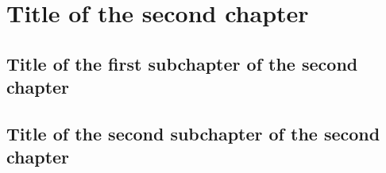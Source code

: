\chapter{Title of the second chapter}

\section{Title of the first subchapter of the second chapter}

\cite{Mihov01directconstruction}

\section{Title of the second subchapter of the second chapter}
